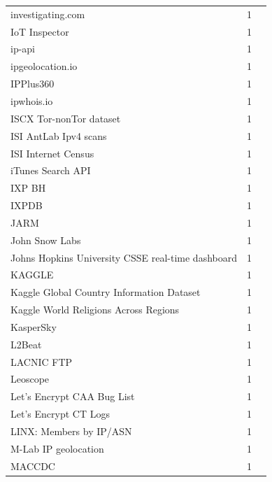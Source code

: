 \documentclass[11pt,a4paper]{article}
\begin{document}
\begin{longtable}{@{}p{} p{}p{}@{}}
investigating.com & 1 & \cite{10.1007/978-3-031-56252-5_3} \\
IoT Inspector & 1 & \cite{10.1145/3618257.3624815} \\
ip-api & 1 & \cite{10.1007/978-3-030-98785-5_24} \\
ipgeolocation.io & 1 & \cite{10.1007/978-3-031-56252-5_11} \\
IPPlus360 & 1 & \cite{10.1145/3777912.3839813} \\
ipwhois.io & 1 & \cite{10.1145/3730567.3764427} \\
ISCX Tor-nonTor dataset & 1 & \cite{10.1145/3517745.3561436} \\
ISI AntLab Ipv4 scans & 1 & \cite{10.1007/978-3-031-56249-5_8} \\
ISI Internet Census & 1 & \cite{10.1145/3777912.3839831} \\
iTunes Search API & 1 & \cite{10.1145/3517745.3561439} \\
IXP BH & 1 & \cite{10.1145/3646547.3688451} \\
IXPDB & 1 & \cite{10.1007/978-3-030-72582-2_14} \\
JARM & 1 & \cite{10.1007/978-3-031-28486-1_6} \\
John Snow Labs & 1 & \cite{10.1145/3777912.3839799} \\
Johns Hopkins University CSSE real-time dashboard & 1 & \cite{10.1145/3487552.3487831} \\
KAGGLE & 1 & \cite{10.1145/3777912.3839799} \\
Kaggle Global Country Information Dataset & 1 & \cite{10.1145/3777912.3839834} \\
Kaggle World Religions Across Regions & 1 & \cite{10.1145/3777912.3839834} \\
KasperSky & 1 & \cite{10.1145/3777912.3839789} \\
L2Beat & 1 & \cite{10.1145/3777912.3839782} \\
LACNIC FTP & 1 & \cite{10.1145/3487552.3487838} \\
Leoscope & 1 & \cite{10.1145/3777912.3839805} \\
Let's Encrypt CAA Bug List & 1 & \cite{10.1007/978-3-030-72582-2_10} \\
Let's Encrypt CT Logs & 1 & \cite{10.1145/3777912.3809148} \\
LINX: Members by IP/ASN & 1 & \cite{10.1007/978-3-030-98785-5_16} \\
M-Lab IP geolocation & 1 & \cite{10.1145/3646547.3688441} \\
MACCDC & 1 & \cite{10.1145/3487552.3487856} \\

\end{longtable}
\end{document}
